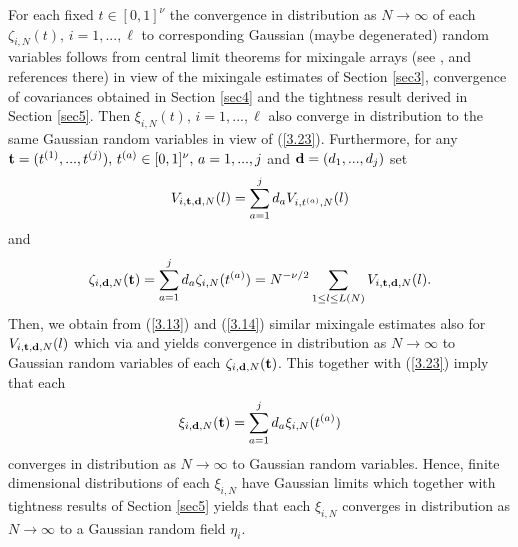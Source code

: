 For each fixed $t\in[0,1]^\nu$ the convergence in distribution as 
$N\to\infty$ of each $\zeta_{i,N}(t),\, i=1,...,\ell$ to corresponding
Gaussian (maybe degenerated) random variables follows from central limit 
theorems for mixingale arrays (see \cite{ML2}, \cite{Jo} and references there)
in view of the mixingale estimates of Section \ref{sec3}, convergence of
covariances obtained in Section \ref{sec4} and the tightness result derived
in Section \ref{sec5}.
Then $\xi_{i,N}(t),\, i=1,...,\ell$ also converge in distribution to the same
Gaussian random variables in view of (\ref{3.23}). Furthermore, for any
${{\bf t}}=(t^{(1)},...,t^{(j)}),\, t^{(a)}\in[0,1]^\nu,\, a=1,...,j$ and
${{\bf d}}=(d_1,...,d_j)$ set
\begin{equation}\label{6.1}
V_{i,{{\bf t}},{{\bf d}},N}(l)=\sum_{a=1}^j d_aV_{i,t^{(a)},N}(l)
\end{equation}
and
\begin{equation}\label{6.2}
\zeta_{i,{{\bf d}},N}({{\bf t}})=\sum_{a=1}^j d_a\zeta_{i,N}(t^{(a)})=N^{-\nu/2}
\sum_{1\leq l\leq L(N)}V_{i,{{\bf t}},{{\bf d}},N}(l).
\end{equation}
Then, we obtain from (\ref{3.13}) and (\ref{3.14}) similar mixingale 
estimates also for $V_{i,{{\bf t}},{{\bf d}},N}(l)$ which via \cite{ML2} and
\cite{Jo} yields convergence in distribution as $N\to\infty$ to Gaussian
random variables of each $\zeta_{i,{{\bf d}},N}({{\bf t}})$. This together with
(\ref{3.23}) imply that each 
\begin{equation}\label{6.3}
\xi_{i,{{\bf d}},N}({{\bf t}})=\sum_{a=1}^j d_a\xi_{i,N}(t^{(a)})
\end{equation}
converges in distribution as $N\to\infty$ to Gaussian random variables.
Hence, finite dimensional distributions of each $\xi_{i,N}$ have Gaussian
limits which together with tightness results of Section \ref{sec5} yields
 that each $\xi_{i,N}$ converges in distribution as $N\to\infty$ to a
 Gaussian random field $\eta_i$.
 
